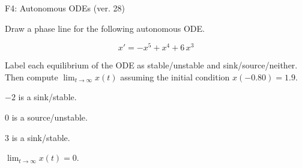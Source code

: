 \begin{exercise}
  \begin{exerciseTitle}F4: Autonomous ODEs (ver. 28)\end{exerciseTitle}
  \begin{exerciseStatement}
    

      Draw a phase line for the following 
      autonomous ODE.
    

    
\[x'= -x^{5} + x^{4} + 6 \, x^{3}\]

    

      Label each equilibrium of the ODE
      as stable/unstable and sink/source/neither.
      Then compute \(\lim_{t\to\infty}x(t)\)
      assuming the initial condition
      \(x( -0.80 )= 1.9\).
    

  \end{exerciseStatement}
  \begin{exerciseAnswer}
    

      \(-2\) is a sink/stable.
      
        \(0\) is a source/unstable.
      
      \(3\) is a sink/stable.
    

    

      \(\lim_{t\to\infty}x(t)=0\).
    

  \end{exerciseAnswer}
\end{exercise}